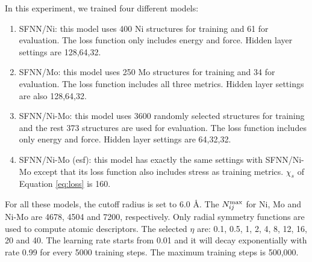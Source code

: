 \documentclass[prb,preprint]{revtex4-2}
\begin{document}
In this experiment, we trained four different models:
\begin{enumerate}
    \item SFNN/Ni: this model uses 400 Ni structures for training and 61 for 
    evaluation. The loss function only includes energy and force. Hidden layer 
    settings are 128,64,32.
    \item SFNN/Mo: this model uses 250 Mo structures for training and 34 for 
    evaluation. The loss function includes all three metrics. Hidden layer 
    settings are also 128,64,32.
    \item SFNN/Ni-Mo: this model uses 3600 randomly selected structures for 
    training and the rest 373 structures are used for evaluation. The loss 
    function includes only energy and force. Hidden layer settings are 64,32,32.
    \item SFNN/Ni-Mo (esf): this model has exactly the same settings with 
    SFNN/Ni-Mo except that its loss function also includes stress as training 
    metrics. $\chi_{s}$ of Equation \ref{eq:loss} is 160.
\end{enumerate}

For all these models, the cutoff radius is set to 6.0 \AA. The $N_{ij}^{\mathrm{max}}$ for Ni, 
Mo and Ni-Mo are 4678, 4504 and 7200, respectively. Only radial symmetry 
functions are used to compute atomic descriptors. The selected $\eta$ are: 
0.1, 0.5, 1, 2, 4, 8, 12, 16, 20 and 40. The learning rate starts from 0.01 and 
it will decay exponentially with rate 0.99 for every 5000 training steps. The
maximum training steps is 500,000.
\end{document}
